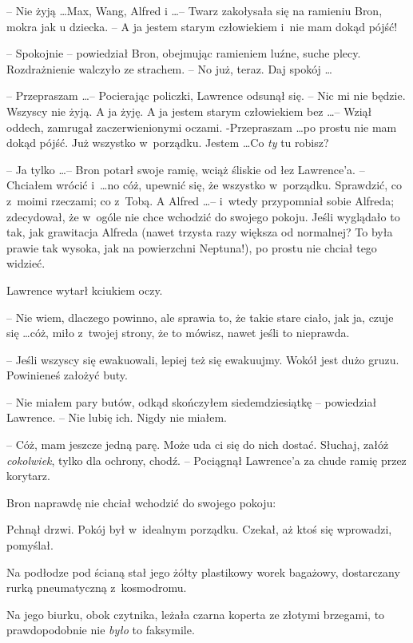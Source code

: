 \documentclass[oneside,polish,11pt,rmheadings]{mwbk}
\begin{document}
-- Nie żyją \ldots Max, Wang, Alfred i \ldots  -- Twarz zakołysała się na ramieniu Bron, mokra jak u dziecka. -- A ja jestem starym człowiekiem i~nie mam dokąd pójść! 

-- Spokojnie -- powiedział Bron, obejmując ramieniem luźne, suche plecy. Rozdrażnienie walczyło ze strachem. -- No już, teraz. Daj spokój  \ldots  

-- Przepraszam \ldots  -- Pocierając policzki, Lawrence odsunął się. -- Nic mi nie będzie. Wszyscy nie żyją. A ja żyję. A ja jestem starym człowiekiem bez \ldots  -- Wziął oddech, zamrugał zaczerwienionymi oczami. -Przepraszam \ldots  po prostu nie mam dokąd pójść. Już wszystko w~porządku. Jestem \ldots  Co \textit{ty }tu robisz? 

-- Ja tylko \ldots  -- Bron potarł swoje ramię, wciąż śliskie od łez Lawrence'a. -- Chciałem wrócić i~\ldots  no cóż, upewnić się, że wszystko w~porządku. Sprawdzić, co z~moimi rzeczami; co z~Tobą. A Alfred \ldots  -- i~wtedy przypomniał sobie Alfreda; zdecydował, że w~ogóle nie chce wchodzić do swojego pokoju. Jeśli wyglądało to tak, jak grawitacja Alfreda (nawet trzysta razy większa od normalnej? To była prawie tak wysoka, jak na powierzchni Neptuna!), po prostu nie chciał tego widzieć. 

Lawrence wytarł kciukiem oczy. 

-- Nie wiem, dlaczego powinno, ale sprawia to, że takie stare ciało, jak ja, czuje się \ldots  cóż, miło z~twojej strony, że to mówisz, nawet jeśli to nieprawda. 

-- Jeśli wszyscy się ewakuowali, lepiej też się ewakuujmy. Wokół jest dużo gruzu. Powinieneś założyć buty. 

-- Nie miałem pary butów, odkąd skończyłem siedemdziesiątkę -- powiedział Lawrence. -- Nie lubię ich. Nigdy nie miałem. 

-- Cóż, mam jeszcze jedną parę. Może uda ci się do nich dostać. Słuchaj, załóż \textit{cokolwiek}, tylko dla ochrony, chodź. -- Pociągnął Lawrence'a za chude ramię przez korytarz. 

Bron naprawdę nie chciał wchodzić do swojego pokoju: 

Pchnął drzwi. Pokój był w~idealnym porządku. Czekał, aż ktoś się wprowadzi, pomyślał. 

Na podłodze pod ścianą stał jego żółty plastikowy worek bagażowy, dostarczany rurką pneumatyczną z~kosmodromu. 

Na jego biurku, obok czytnika, leżała czarna koperta ze złotymi brzegami, to prawdopodobnie nie \textit{było } to faksymile. 
\end{document}
